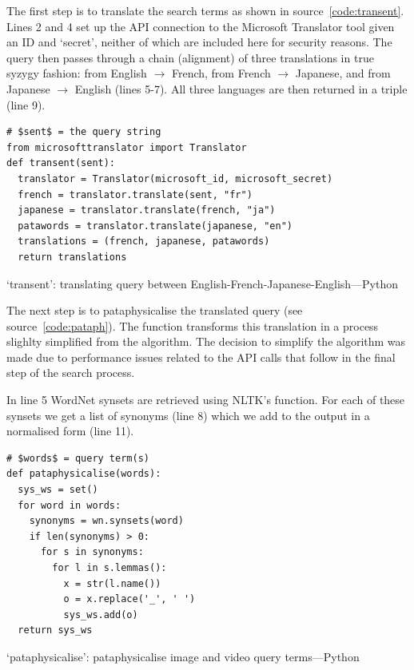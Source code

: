 The first step is to translate the search terms as shown in source~\ref{code:transent}. Lines 2 and 4 set up the \ac{API} connection to the Microsoft Translator tool \autocite{TranslatorAPI} given an ID and `secret', neither of which are included here for security reasons. The query  then passes through a chain (alignment) of three translations in true syzygy fashion: from English $\to$ French, from French $\to$ Japanese, and from Japanese $\to$ English (lines 5-7). All three languages are then returned in a triple (line 9).

\begin{listing}[!htbp] %
  \begin{verbatim}
# $sent$ = the query string
from microsofttranslator import Translator
def transent(sent):
  translator = Translator(microsoft_id, microsoft_secret)
  french = translator.translate(sent, "fr")
  japanese = translator.translate(french, "ja")
  patawords = translator.translate(japanese, "en")
  translations = (french, japanese, patawords)
  return translations
  \end{verbatim}
\caption[`transent' function---Python]{`transent': translating query between English-French-Japanese-English---Python}
\label{code:transent}
\end{listing}

The next step is to pataphysicalise the translated query (see source~\ref{code:pataph}). The  function transforms this translation in a process slighlty simplified from the  algorithm. The decision to simplify the algorithm was made due to performance issues related to the \ac{API} calls that follow in the final step of the search process. 

In line 5 WordNet synsets are retrieved using \ac{NLTK}'s  function. For each of these synsets we get a list of synonyms (line 8) which we add to the output in a normalised form (line 11).

\begin{listing}[!htbp] %
  \begin{verbatim}
# $words$ = query term(s)
def pataphysicalise(words):
  sys_ws = set()
  for word in words:
    synonyms = wn.synsets(word)
    if len(synonyms) > 0:
      for s in synonyms:
        for l in s.lemmas():
          x = str(l.name())
          o = x.replace('_', ' ')
          sys_ws.add(o)
  return sys_ws
  \end{verbatim}
\caption[`pataphysicalise' function---Python]{`pataphysicalise': pataphysicalise image and video query terms---Python}
\label{code:pataph}
\end{listing}


